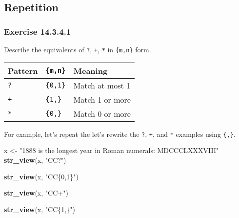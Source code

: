 \documentclass[]{book}
\newenvironment{Shaded}{\begin{snugshade}}{\end{snugshade}}
\newcommand{\KeywordTok}[1]{\textcolor[rgb]{0.13,0.29,0.53}{\textbf{#1}}}
\newcommand{\NormalTok}[1]{#1}
\newcommand{\StringTok}[1]{\textcolor[rgb]{0.31,0.60,0.02}{#1}}
\theoremstyle{plain}
\theoremstyle{remark}
\begin{document}
\hypertarget{repetition}{%
\subsection{Repetition}\label{repetition}}

\hypertarget{exercise-14.3.4.1}{%
\subsubsection*{\texorpdfstring{Exercise
{14.3.4.1}}{Exercise 14.3.4.1}}\label{exercise-14.3.4.1}}

Describe the equivalents of \texttt{?}, \texttt{+}, \texttt{*} in
\texttt{\{m,n\}} form.

\begin{longtable}[]{@{}lll@{}}
\toprule
Pattern & \texttt{\{m,n\}} & Meaning\tabularnewline
\midrule
\endhead
\texttt{?} & \texttt{\{0,1\}} & Match at most 1\tabularnewline
\texttt{+} & \texttt{\{1,\}} & Match 1 or more\tabularnewline
\texttt{*} & \texttt{\{0,\}} & Match 0 or more\tabularnewline
\bottomrule
\end{longtable}

For example, let's repeat the let's rewrite the \texttt{?}, \texttt{+},
and \texttt{*} examples using \texttt{\{,\}}.

\begin{Shaded}
\begin{Highlighting}[]
\NormalTok{x <-}\StringTok{ "1888 is the longest year in Roman numerals: MDCCCLXXXVIII"}
\KeywordTok{str_view}\NormalTok{(x, }\StringTok{"CC?"}\NormalTok{)}
\end{Highlighting}
\end{Shaded}

\begin{Shaded}
\begin{Highlighting}[]
\KeywordTok{str_view}\NormalTok{(x, }\StringTok{"CC\{0,1\}"}\NormalTok{)}
\end{Highlighting}
\end{Shaded}

\begin{Shaded}
\begin{Highlighting}[]
\KeywordTok{str_view}\NormalTok{(x, }\StringTok{"CC+"}\NormalTok{)}
\end{Highlighting}
\end{Shaded}

\begin{Shaded}
\begin{Highlighting}[]
\KeywordTok{str_view}\NormalTok{(x, }\StringTok{"CC\{1,\}"}\NormalTok{)}
\end{Highlighting}
\end{Shaded}
\end{document}
